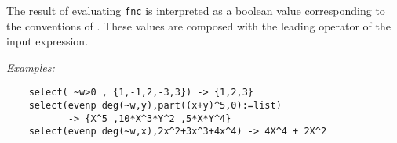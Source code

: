 The result of evaluating \texttt{fnc} is
interpreted as a boolean value corresponding to the conventions of
\REDUCE. These values are composed with the leading operator of the
input expression.

\textit{Examples:}\nopagebreak
\begin{verbatim}
    select( ~w>0 , {1,-1,2,-3,3}) -> {1,2,3}
    select(evenp deg(~w,y),part((x+y)^5,0):=list)
           -> {X^5 ,10*X^3*Y^2 ,5*X*Y^4}
    select(evenp deg(~w,x),2x^2+3x^3+4x^4) -> 4X^4 + 2X^2
\end{verbatim}
